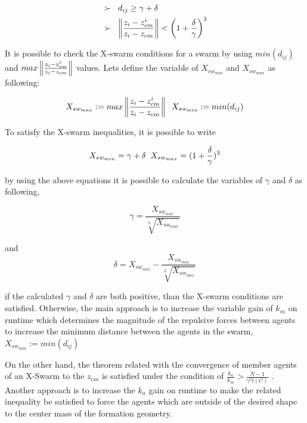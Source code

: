 \begin{align}
\begin{split}
&\succ\hspace{0.2cm}  d_{ij} \geq \gamma + \delta \\
&\succ \hspace{0.2cm}   \left\lVert\frac{z_i - z_{cm}^i}{z_i - z_{cm}}\right\rVert < \left(1+\frac{\delta}{\gamma}\right)^3
\end{split}
\end{align}
		
It is possible to check the X-swarm conditions for a swarm  by using $min(d_{ij})$ and $max \left\lVert\frac{z_i - z_{cm}^i}{z_i - z_{cm}}\right\rVert $ values. Lets define the variable  of $X_{sw_{min}}$ and $X_{sw_{max}}$ as following:

\begin{equation}
X_{sw_{max}} := max \left\lVert\frac{z_i - z_{cm}^i}{z_i - z_{cm}}\right\rVert  \hspace{0.2cm} X_{sw_{min}} := min(d_{ij})
\end{equation}

To satisfy the X-swarm inequalities, it is possible to write 

\begin{equation}
 X_{sw_{min}} = \gamma + \delta  \hspace{0.2cm} X_{sw_{max}} = (1 + \frac{\delta}{\gamma})^3
\end{equation}

by using the above equations it is possible to calculate the variables of $\gamma$ and $\delta$ as following,

\begin{equation}
\gamma = \frac{ X_{sw_{min}}}{\sqrt[3]{ X_{sw_{max}}}}
\end{equation}
			
and
\begin{equation}
\delta =  X_{sw_{min}} - \frac{ X_{sw_{min}}}{\sqrt[3]{ X_{sw_{max}}}}
\end{equation}

if the calculated  $\gamma$ and $\delta$ are both positive, than the X-swarm conditions are satisfied. Otherwise, the main approach is to increase the variable gain of $k_m$ on runtime which determines the magnitude of the repulsive forces between agents to increase the minimum distance between the agents in the swarm, $X_{sw_{min}} := min(d_{ij})$
			
On the other hand, the theorem related with the convergence of member agents of an X-Swarm to the $z_{cm}$ is satisfied under the condition of $\frac{k_a}{k_m} > \frac{N-1}{\gamma^3  l(C)}$ . Another approach is to increase the $k_a$ gain on runtime to make the related inequality be satisfied to force the agents which are outside of the desired shape to the center mass of the formation geometry. 
					
